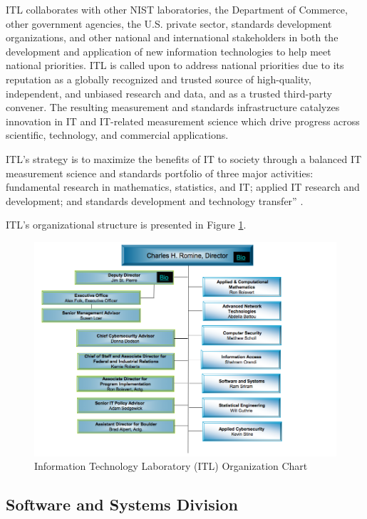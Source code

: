 ITL collaborates with other NIST laboratories, the Department of Commerce, other government agencies, the U.S. private sector, standards development organizations, and other national and international stakeholders in both the development and application of new information technologies to help meet national priorities. ITL is called upon to address national priorities due to its reputation as a globally recognized and trusted source of high-quality, independent, and unbiased research and data, and as a trusted third-party convener. The resulting measurement and standards infrastructure catalyzes innovation in IT and IT-related measurement science which drive progress across scientific, technology, and commercial applications.

ITL’s strategy is to maximize the benefits of IT to society through a balanced IT measurement science and standards portfolio of three major activities: fundamental research in mathematics, statistics, and IT; applied IT research and development; and standards development and technology transfer'' \cite{nist2016itlpresentation}.

ITL's organizational structure is presented in Figure \ref{fig:nist-itl-organization-chart}. 

\begin{figure}[ht]
  \centering
  \includegraphics[scale=0.50]{figures/nist-itl-organization-chart}
  \caption{Information Technology Laboratory (ITL) Organization Chart \cite{nist2016itlorgchart}}
  \label{fig:nist-itl-organization-chart}
\end{figure}

\clearpage

\subsection{Software and Systems Division}

